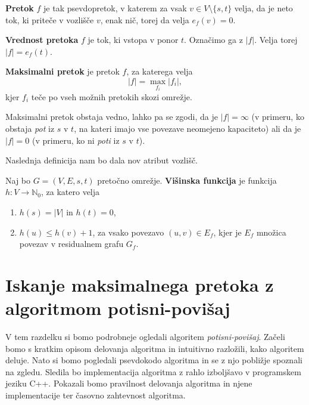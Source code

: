 \documentclass[mat1]{fmfdelo}
\newcommand{\N}{\mathbb N}
\begin{document}
\begin{definicija}
\textbf{Pretok} $f$ je tak psevdopretok, v katerem za vsak $v \in V \setminus\{s,t\}$ velja, da je neto tok, ki priteče v vozlišče $v$, enak nič, torej da velja $e_f(v) = 0$.
\end{definicija}

\begin{definicija}
\textbf{Vrednost pretoka} $f$ je tok, ki vstopa v ponor $t$. Označimo ga z $|f|$. Velja torej $|f| = e_f(t)$.
\end{definicija}

\begin{definicija}
\textbf{Maksimalni pretok} je pretok $f$, za katerega velja \[|f| = \max_{f_i} |f_i|,\] kjer $f_i$ teče po vseh možnih pretokih skozi omrežje.
\end{definicija}

\begin{opomba}
  Maksimalni pretok obstaja vedno, lahko pa se zgodi, da je $|f| = \infty$ (v primeru, ko obstaja \textit{pot} iz $s$ v $t$, na kateri imajo vse povezave neomejeno kapaciteto)
  ali da je $|f| = 0$ (v primeru, ko ni \textit{poti} iz $s$ v $t$).
\end{opomba}

Naslednja definicija nam bo dala nov atribut vozlišč.

\begin{definicija}\label{def:visinska_funkcija}
Naj bo $G=(V,E,s,t)$ pretočno omrežje. \textbf{Višinska funkcija} je funkcija $h\colon V \rightarrow \N_0$, za katero velja
\begin{enumerate}
\item $h(s) = |V|$ in $h(t) = 0$,
\item $h(u) \leq h(v) + 1$, za vsako povezavo $(u,v) \in E_f$, kjer je $E_f$ množica povezav v residualnem grafu $G_f$.
\end{enumerate}
\end{definicija}








\section{Iskanje maksimalnega pretoka z algoritmom potisni-povišaj}

V tem razdelku si bomo podrobneje ogledali algoritem \textit{potisni-povišaj}. Začeli bomo s kratkim opisom delovanja algoritma in intuitivno razložili, kako algoritem deluje. Nato si bomo pogledali psevdokodo algoritma in se z njo pobližje spoznali na zgledu. Sledila bo implementacija algoritma z rahlo izboljšavo v programskem jeziku C++. Pokazali bomo pravilnost delovanja algoritma in njene implementacije ter časovno zahtevnost algoritma.
\end{document}
